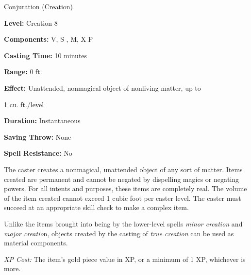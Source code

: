 
Conjuration (Creation)

\textbf{Level:} Creation 8

\textbf{Components:} V, S , M, X P

\textbf{Casting Time:} 10 minutes

\textbf{Range:} 0 ft.

\textbf{Effect:} Unattended, nonmagical object of nonliving matter, up to

1 cu. ft./level

\textbf{Duration:} Instantaneous

\textbf{Saving Throw:} None

\textbf{Spell Resistance:} No

The caster creates a nonmagical, unattended object of any sort of matter. Items 
created are permanent and cannot be negated by dispelling magics or negating powers. 
For all intents and purposes, these items are completely real. The volume of the 
item created cannot exceed 1 cubic foot per caster level. The caster must succeed 
at an appropriate skill check to make a complex item.

Unlike the items brought into being by the lower-level spells \textit{minor creation 
}and \textit{major creatio}n, objects created by the casting of \textit{true creation 
}can be used as material components.

\textit{XP Cost:} The item's gold piece value in XP, or a minimum of 1 XP, whichever 
is more.
